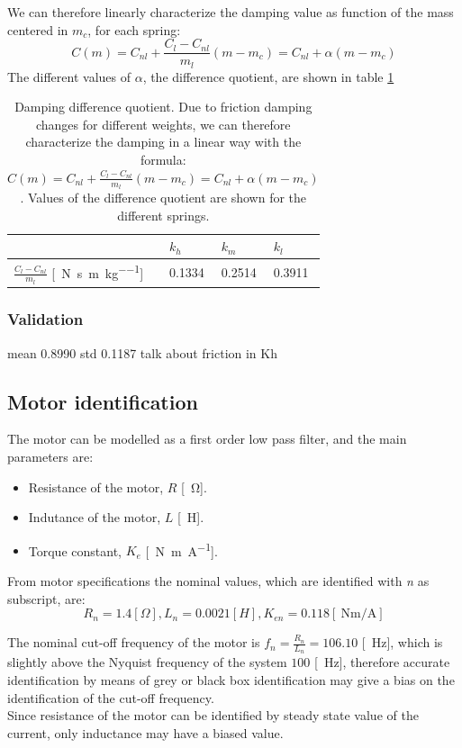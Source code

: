 We can therefore linearly characterize the damping value as function of the mass centered in $m_c$, for each spring:
$$C(m)=C_{nl}+ \frac{C_{l}-C_{nl}}{m_{l}}(m -m_{c}) = C_{nl} +\alpha (m-m_{c})$$
The different values of $\alpha$, the difference quotient, are shown in table \ref{table: cart_detached_damping_quotient}

\begin{table}[!h]
\centering
\label{table: cart_detached_damping_quotient}
\begin{tabular}{|l|l|l|l|}
\hline
 & \textbf{$k_h$} & \textbf{$k_m$}   & \textbf{$k_l$}   \\ \hline
$\frac{C_{l}-C_{nl}}{m_{l}}$ [\SI{}{\newton \second \per \metre \per \kilo\gram}]       &0.1334   & 0.2514 & 0.3911 \\ \hline
\end{tabular}
\caption{Damping difference quotient. Due to friction damping changes for different weights, we can therefore characterize the damping in a linear way with the formula: $C(m)=C_{nl}+ \frac{C_{l}-C_{nl}}{m_{l}}(m -m_{c})= C_{nl} +\alpha (m-m_{c})$. Values of the difference quotient are shown for the different springs.}
\end{table}


\subsubsection{Validation}
mean 0.8990 std  0.1187
talk about friction in Kh

\subsection{Motor identification}
The motor can be modelled as a first order low pass filter, and the main parameters are:
\begin{itemize}
\item Resistance of the motor, $R$ [\SI{}{\ohm}].
\item Indutance of the motor, $L$ [\SI{}{\henry}].
\item Torque constant, $K_e$ [\SI{}{\newton \metre \per \ampere}].
\end{itemize}
From motor specifications the nominal values, which are identified with \emph{n} as subscript, are:
$$R_n = 1.4 [\Omega], L_n = 0.0021 [H], K_{en} =0.118 [\SI{}{\newton\metre \per\ampere}]$$

The nominal cut-off frequency of the motor  is $f_n = 	\frac{R_n}{L_n} = 106.10$ [\SI{}{\hertz}], which is slightly above the Nyquist frequency of the system $100$ [\SI{}{\hertz}], therefore accurate identification by means of grey or black box identification may give a bias on the identification of the cut-off frequency. \\ Since resistance of the motor can be identified by  steady state value of the current, only inductance may have a biased value. \\ \\


